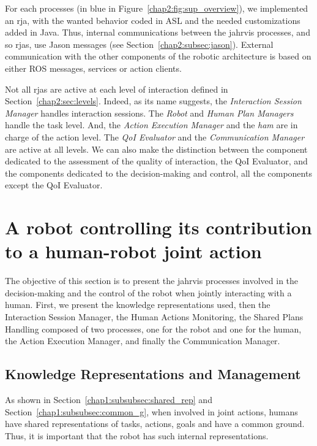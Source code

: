 \documentclass[a4paper,11pt,twoside]{StyleThese}
\begin{document}
For each processes (in blue in Figure~\ref{chap2:fig:sup_overview}), we implemented an \acrshort{rja}, with the wanted behavior coded in ASL and the needed customizations added in Java. Thus, internal communications between the \acrshort{jahrvis} processes, and so \acrshort{rja}s, use Jason messages (see Section~\ref{chap2:subsec:jason}). External communication with the other components of the robotic architecture is based on either ROS messages, services or action clients.

Not all \acrshort{rja}s are active at each level of interaction defined in Section~\ref{chap2:sec:levels}. Indeed, as its name suggests, the \textit{Interaction Session Manager} handles interaction sessions. The \textit{Robot} and \textit{Human Plan Managers} handle the task level. And, the \textit{Action Execution Manager} and the \textit{\acrlong{ham}} are in charge of the action level. The \textit{QoI Evaluator} and the \textit{Communication Manager} are active at all levels. We can also make the distinction between the component dedicated to the assessment of the quality of interaction, \ie the QoI Evaluator, and the components dedicated to the decision-making and control, \ie all the components except the QoI Evaluator.


\section{A robot controlling its contribution to a human-robot joint action}\label{chap2:sec:control}

The objective of this section is to present the \acrshort{jahrvis} processes involved in the decision-making and the control of the robot when jointly interacting with a human. First, we present the knowledge representations used, then the Interaction Session Manager, the Human Actions Monitoring, the Shared Plans Handling composed of two processes, one for the robot and one for the human, the Action Execution Manager, and finally the Communication Manager.

\subsection{Knowledge Representations and Management}\label{chap2:subsec:know}
As shown in Section~\ref{chap1:subsubsec:shared_rep} and Section~\ref{chap1:subsubsec:common_g}, when involved in joint actions, humans have shared representations of tasks, actions, goals and have a common ground. Thus, it is important that the robot has such internal representations.
\end{document}
